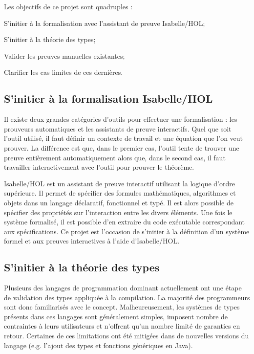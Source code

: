\documentclass[a4paper, oneside, 12pt, titlepage]{article}
\begin{document}

Les objectifs de ce projet sont quadruples :
\begin{enumerate*}[label=\arabic*)]
  \item S'initier à la formalisation avec l'assistant de preuve Isabelle/HOL;
  \item S'initier à la théorie des types;
  \item Valider les preuves manuelles existantes;
  \item Clarifier les cas limites de ces dernières.
\end{enumerate*}

\subsection{S'initier à la formalisation Isabelle/HOL}

Il existe deux grandes catégories d'outils pour effectuer une formalisation : les prouveurs
automatiques et les assistants de preuve interactifs. Quel que soit l'outil utilisé, il faut définir
un contexte de travail et une équation que l'on veut prouver. La différence est que, dans le premier
cas, l'outil tente de trouver une preuve entièrement automatiquement alors que, dans le second
cas, il faut travailler interactivement avec l'outil pour prouver le théorème.

Isabelle/HOL est un assistant de preuve interactif utilisant la logique d'ordre supérieure. Il
permet de spécifier des formules mathématiques, algorithmes et objets dans un langage déclaratif,
fonctionnel et typé. Il est alors possible de spécifier des propriétés sur l'interaction entre les
divers éléments. Une fois le système formalisé, il est possible d'en extraire du code exécutable
correspondant aux spécifications. Ce projet est l'occasion de s'initier à la définition d'un
système formel et aux preuves interactives à l'aide d'Isabelle/HOL.

\subsection{S'initier à la théorie des types}

Plusieurs des langages de programmation dominant actuellement ont une étape de validation des types
appliquée à la compilation. La majorité des programmeurs sont donc familiarisés avec le concept.
Malheureusement, les systèmes de types présents dans ces langages sont généralement simples,
imposent nombre de contraintes à leurs utilisateurs et n'offrent qu'un nombre limité de garanties en
retour. Certaines de ces limitations ont été mitigées dans de nouvelles versions du langage (e.g.
l'ajout des types et fonctions génériques en Java).
\end{document}
